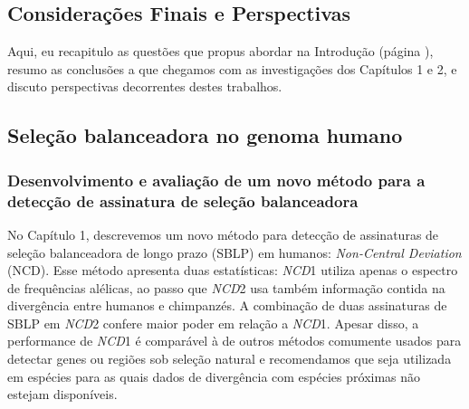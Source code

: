 \begin{refsection}
\chapter*{Considerações Finais e Perspectivas}
\pagestyle{fancy}
\fancyhf{}
\fancyfoot[C]{\thepage}
\label{chap:conclusions}


\lettrine[lines=3]{\color{airforceblue}A}{}qui, eu recapitulo as questões que propus abordar na Introdução (página \pageref{subsec:Perguntas}), resumo as conclusões a que chegamos com as investigações dos Capítulos 1 e 2, e discuto perspectivas decorrentes destes trabalhos.


\section{Seleção balanceadora no genoma humano}

\subsection{Desenvolvimento e avaliação de um novo método para a detecção de assinatura de seleção balanceadora}

No Capítulo 1, descrevemos um novo método para detecção de assinaturas de seleção balanceadora de longo prazo (SBLP) em humanos: \emph{Non-Central Deviation} (NCD). Esse método apresenta duas estatísticas: \emph{NCD}1 utiliza apenas  o espectro de frequências alélicas, ao passo que \emph{NCD}2  usa também informação contida na divergência entre humanos e chimpanzés. A combinação de duas assinaturas de SBLP em \emph{NCD}2 confere maior poder em relação a \emph{NCD}1. Apesar disso, a performance de \emph{NCD}1 é comparável à de outros métodos comumente usados para detectar genes ou regiões sob seleção natural e recomendamos que seja utilizada em  espécies para as quais dados de divergência com espécies próximas não estejam disponíveis.


\end{refsection}
